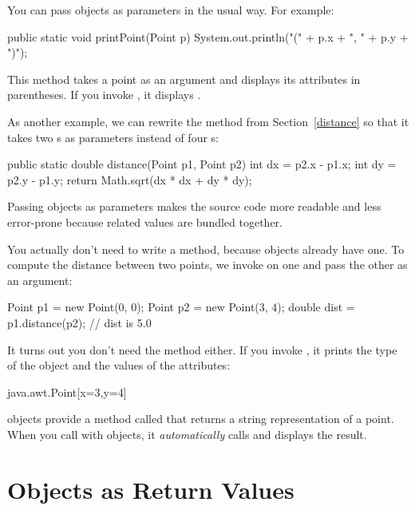 
You can pass objects as parameters in the usual way.
For example:


\begin{code}
public static void printPoint(Point p) {
    System.out.println("(" + p.x + ", " + p.y + ")");
}
\end{code}

This method takes a point as an argument and displays its attributes in parentheses.
If you invoke , it displays .

As another example, we can rewrite the  method from Section~\ref{distance} so that it takes two s as parameters instead of four s:

\begin{code}
public static double distance(Point p1, Point p2) {
    int dx = p2.x - p1.x;
    int dy = p2.y - p1.y;
    return Math.sqrt(dx * dx + dy * dy);
}
\end{code}

Passing objects as parameters makes the source code more readable and less error-prone because related values are bundled together.

You actually don't need to write a  method, because  objects already have one.
To compute the distance between two points, we invoke  on one and pass the other as an argument:

\begin{code}
Point p1 = new Point(0, 0);
Point p2 = new Point(3, 4);
double dist = p1.distance(p2);  // dist is 5.0
\end{code}

It turns out you don't need the  method either.
If you invoke , it prints the type of the object and the values of the attributes:

\begin{stdout}
java.awt.Point[x=3,y=4]
\end{stdout}


 objects provide a method called  that returns a string representation of a point.
When you call  with objects, it {\em automatically} calls  and displays the result.


\section{Objects as Return Values}
\label{mutable-objects_objects-as-return-values}
\label{sec:Rectangle}

